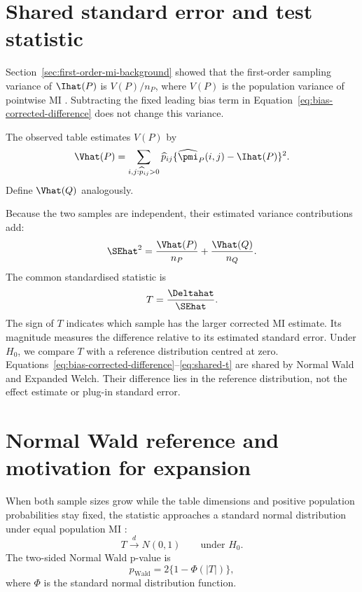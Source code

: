 \section{Shared standard error and test statistic}

Section~\ref{sec:first-order-mi-background} showed that the first-order
sampling variance of \(\Ihat(P)\) is \(V(P)/n_P\), where \(V(P)\) is the
population variance of pointwise MI \citep{moddemeijer1989,brillinger2004}.
Subtracting the fixed leading bias term
in Equation~\eqref{eq:bias-corrected-difference} does not change this
variance.

The observed table estimates \(V(P)\) by
\begin{equation}
  \Vhat(P)
  =\sum_{i,j:\widehat p_{ij}>0}
  \widehat p_{ij}
  \{\widehat\pmi_P(i,j)-\Ihat(P)\}^2.
  \label{eq:estimated-mi-variance}
\end{equation}
Define \(\Vhat(Q)\) analogously.

Because the two samples are independent, their estimated variance
contributions add:
\begin{equation}
  \SEhat^2
  =\frac{\Vhat(P)}{n_P}
  +\frac{\Vhat(Q)}{n_Q}.
  \label{eq:shared-se}
\end{equation}
The common standardised statistic is
\begin{equation}
  T=\frac{\Deltahat}{\SEhat}.
  \label{eq:shared-t}
\end{equation}
The sign of \(T\) indicates which sample has the larger corrected MI
estimate. Its magnitude measures the difference relative to its estimated
standard error. Under \(H_0\), we compare \(T\) with a reference distribution
centred at zero.
Equations~\eqref{eq:bias-corrected-difference}--\eqref{eq:shared-t} are shared
by Normal Wald and Expanded Welch. Their difference lies in the reference
distribution, not the effect estimate or plug-in standard error.

\section{Normal Wald reference and motivation for expansion}

When both sample sizes grow while the table dimensions and positive
population probabilities stay fixed, the statistic approaches a standard
normal distribution under equal population MI
\citep{wald1943,vanderVaart1998}:
\begin{equation}
  T\xrightarrow{d}N(0,1)
  \qquad\text{under }H_0.
\end{equation}
The two-sided Normal Wald p-value is
\begin{equation}
  p_{\mathrm{Wald}}
  =2\{1-\Phi(|T|)\},
  \label{eq:wald-pvalue}
\end{equation}
where \(\Phi\) is the standard normal distribution function.

